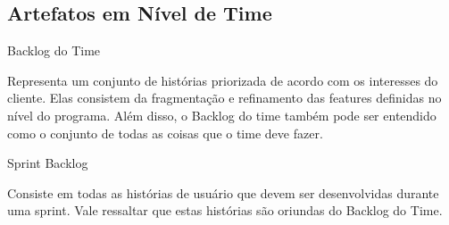{\large{\subsection{Artefatos em Nível de Time \\}}}
\begin{itemize}

{
    \large{\item Backlog do Time \\}

    \tab Representa um conjunto de histórias priorizada de acordo com os interesses do cliente. Elas consistem da fragmentação e refinamento das features definidas no nível do programa. Além disso, o Backlog do time também pode ser entendido como o conjunto de todas as coisas que o time deve fazer. \\
}

{
    \large{\item Sprint Backlog\\}

    \tab Consiste em todas as histórias de usuário que devem ser desenvolvidas durante uma sprint. Vale ressaltar que estas histórias são oriundas do Backlog do Time. \\
}
\end{itemize}

